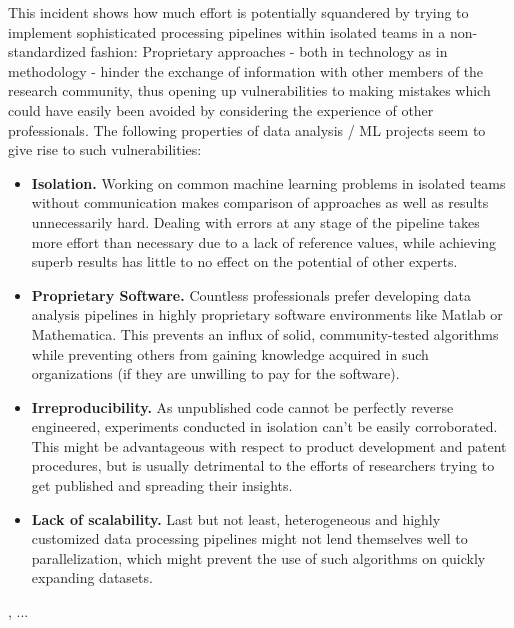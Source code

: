 \par

This incident shows how much effort is potentially squandered by trying to implement sophisticated processing pipelines within isolated teams in a non-standardized fashion: Proprietary approaches - both in technology as in methodology - hinder the exchange of information with other members of the research community, thus opening up vulnerabilities to making mistakes which could have easily been avoided by considering the experience of other professionals. The following properties of data analysis / ML projects seem to give rise to such vulnerabilities:

\begin{itemize}
	\item \textbf{Isolation.} Working on common machine learning problems in isolated teams without communication makes comparison of approaches as well as results unnecessarily hard. Dealing with errors at any stage of the pipeline takes more effort than necessary due to a lack of reference values, while achieving superb results has little to no effect on the potential of other experts.
	\item \textbf{Proprietary Software.} Countless professionals prefer developing data analysis pipelines in highly proprietary software environments like Matlab or Mathematica. This prevents an influx of solid, community-tested algorithms while preventing others from gaining knowledge acquired in such organizations (if they are unwilling to pay for the software).
	\item \textbf{Irreproducibility.} As unpublished code cannot be perfectly reverse engineered, experiments conducted in isolation can't be easily corroborated. This might be advantageous with respect to product development and patent procedures, but is usually detrimental to the efforts of researchers trying to get published and spreading their insights.
	\item \textbf{Lack of scalability.} Last but not least, heterogeneous and highly customized data processing pipelines might not lend themselves well to parallelization, which might prevent the use of such algorithms on quickly expanding datasets.
\end{itemize}



\cite{LargeScaleMLPipelines}, ...
\cite{MLPipelineMLlib}
\cite{DataAnalysisDSWorkflow}
\cite{StanfordNLP}
\cite{MLPipelines}
\cite{Make2013}
\cite{AnalLifecycle}
\cite{DataScienceTools2013}
\cite{AnalOneComponent2013}


